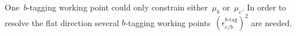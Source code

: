 One~$b$-tagging working point could only constrain either~$ \mu_b$ or~$\mu_c$. In order to resolve the flat direction several $b$-tagging working points~$\left(\epsilon_{c/b}^{\text{$b$-tag}} \right)^2$ are needed. 


